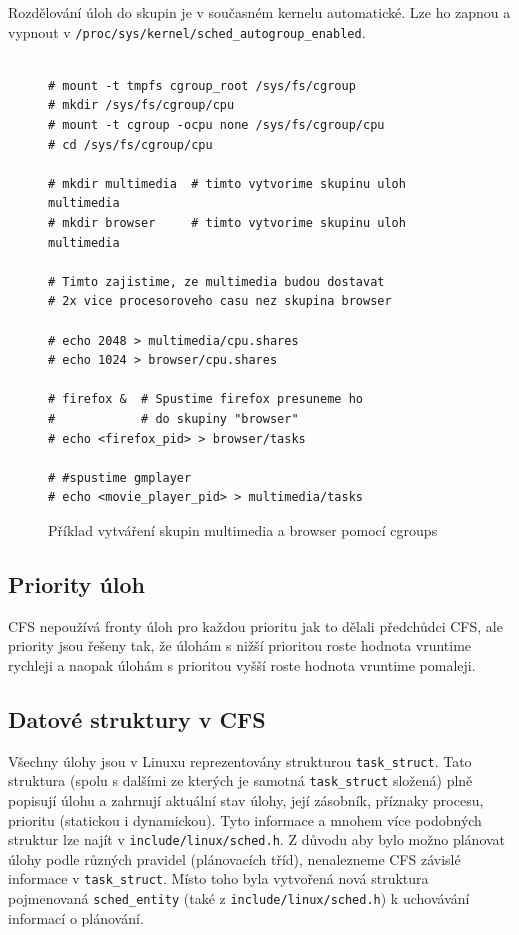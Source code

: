 \documentclass[a4paper,12pt]{article}
\begin{document}
Rozdělování úloh do skupin je v současném kernelu automatické. Lze ho zapnou a vypnout v \verb#/proc/sys/kernel/sched_autogroup_enabled#.

\newpage

\begin{figure}[ht]
\caption{Příklad vytváření skupin multimedia a browser pomocí cgroups}
\center
\label{cgroups}

\begin{Verbatim}[frame=single]

# mount -t tmpfs cgroup_root /sys/fs/cgroup
# mkdir /sys/fs/cgroup/cpu
# mount -t cgroup -ocpu none /sys/fs/cgroup/cpu
# cd /sys/fs/cgroup/cpu

# mkdir multimedia  # timto vytvorime skupinu uloh multimedia 
# mkdir browser     # timto vytvorime skupinu uloh multimedia 

# Timto zajistime, ze multimedia budou dostavat 
# 2x vice procesoroveho casu nez skupina browser

# echo 2048 > multimedia/cpu.shares
# echo 1024 > browser/cpu.shares

# firefox &  # Spustime firefox presuneme ho
#            # do skupiny "browser"
# echo <firefox_pid> > browser/tasks

# #spustime gmplayer
# echo <movie_player_pid> > multimedia/tasks

\end{Verbatim}
\end{figure}

\subsection{Priority úloh}

CFS nepoužívá fronty úloh pro každou prioritu jak to dělali předchůdci CFS, ale priority jsou řešeny tak, že úlohám s nižší prioritou roste hodnota vruntime rychleji a naopak úlohám s prioritou vyšší roste hodnota vruntime pomaleji.

\subsection{Datové struktury v CFS}

Všechny úlohy jsou v Linuxu reprezentovány strukturou \verb#task_struct#. Tato struktura (spolu s dalšími ze kterých je samotná \verb#task_struct# složená) plně popisují úlohu a zahrnují aktuální stav úlohy, její zásobník, příznaky procesu, prioritu (statickou i dynamickou). Tyto informace a mnohem více podobných struktur lze najít v \verb#include/linux/sched.h#. Z důvodu aby bylo možno plánovat úlohy podle různých pravidel (plánovacích tříd), nenalezneme CFS závislé informace v \verb#task_struct#. Místo toho byla vytvořená nová struktura pojmenovaná \verb#sched_entity# (také z \verb#include/linux/sched.h#) k uchovávání informací o plánování.
\end{document}
